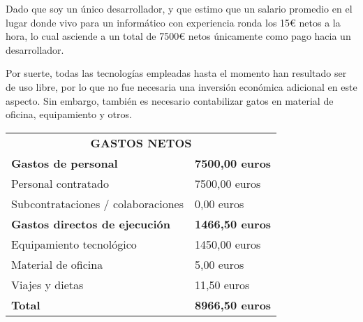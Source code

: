 Dado que soy un único desarrollador, y que estimo que un salario promedio en el lugar donde vivo para un informático con experiencia ronda los 15€ netos a la hora, lo cual asciende a un total de 7500€ netos únicamente como pago hacia un desarrollador.

Por suerte, todas las tecnologías empleadas hasta el momento han resultado ser de uso libre, por lo que no fue necesaria una inversión económica adicional en este aspecto. Sin embargo, también es necesario contabilizar gatos en material de oficina, equipamiento y otros.

\begin{table}[H]
    \begin{tabular}{ll}
        \multicolumn{2}{c}{\textbf{GASTOS NETOS}}               \\
        \rowcolor[HTML]{C0C0C0} 
        \textbf{Gastos de personal}           & \textbf{7500,00 euros} \\
        Personal contratado                   & 7500,00 euros          \\
        Subcontrataciones / colaboraciones    & 0,00 euros             \\
        \rowcolor[HTML]{C0C0C0} 
        \textbf{Gastos directos de ejecución} & \textbf{1466,50 euros} \\
        Equipamiento tecnológico              & 1450,00 euros          \\
        Material de oficina                   & 5,00 euros             \\
        Viajes y dietas                       & 11,50 euros            \\ \hline
        \rowcolor[HTML]{C0C0C0} 
        \textbf{Total}                        & \textbf{8966,50 euros}
    \end{tabular}
\end{table}
